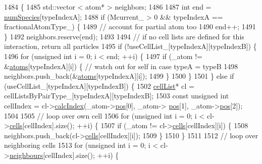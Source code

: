 \begin{DoxyCode}
1484                                                                                                            
                    \{
1485     std::vector < atom* > neighbors;
1486 
1487     \textcolor{keywordtype}{int} end = \hyperlink{classsim_system_a9eea865e6dc1cff377b1e79c4d9c23f0}{numSpecies}[typeIndexA];
1488     \textcolor{keywordflow}{if} (Mcurrent\_ > 0 && typeIndexA == fractionalAtomType\_) \{
1489         \textcolor{comment}{// account for partial atom too}
1490         end++;
1491     \}
1492     neighbors.reserve(end);
1493 
1494     \textcolor{comment}{// if no cell lists are defined for this interaction, return all particles}
1495     \textcolor{keywordflow}{if} (!useCellList\_[typeIndexA][typeIndexB]) \{
1496         \textcolor{keywordflow}{for} (\textcolor{keywordtype}{unsigned} \textcolor{keywordtype}{int} i = 0; i < end; ++i) \{
1497             \textcolor{keywordflow}{if} (\_atom != &\hyperlink{classsim_system_a90421b19082f7fb8fc23b7264b1161e4}{atoms}[typeIndexA][i]) \{ \textcolor{comment}{// watch out for self in case typeA = typeB}
1498                 neighbors.push\_back(&\hyperlink{classsim_system_a90421b19082f7fb8fc23b7264b1161e4}{atoms}[typeIndexA][i]);
1499             \}
1500         \}
1501     \} \textcolor{keywordflow}{else} \textcolor{keywordflow}{if} (useCellList\_[typeIndexA][typeIndexB]) \{
1502         \hyperlink{classcell_list}{cellList}* cl = cellListsByPairType\_[typeIndexA][typeIndexB];
1503         \textcolor{keyword}{const} \textcolor{keywordtype}{unsigned} \textcolor{keywordtype}{int} cellIndex = cl->\hyperlink{classcell_list_aa6b843131cd487164a137571c7343cab}{calcIndex}(\_atom->\hyperlink{classatom_a3ae5f4880e7831d8b2c9fda72b4eb24a}{pos}[0], \_atom->
      \hyperlink{classatom_a3ae5f4880e7831d8b2c9fda72b4eb24a}{pos}[1], \_atom->\hyperlink{classatom_a3ae5f4880e7831d8b2c9fda72b4eb24a}{pos}[2]);
1504 
1505         \textcolor{comment}{// loop over own cell}
1506         \textcolor{keywordflow}{for} (\textcolor{keywordtype}{unsigned} \textcolor{keywordtype}{int} i = 0; i < cl->\hyperlink{classcell_list_a10bc0c3ae819293b1e88bc7d1bfdb2aa}{cells}[cellIndex].size(); ++i) \{
1507             \textcolor{keywordflow}{if} (\_atom != cl->\hyperlink{classcell_list_a10bc0c3ae819293b1e88bc7d1bfdb2aa}{cells}[cellIndex][i]) \{
1508                 neighbors.push\_back(cl->\hyperlink{classcell_list_a10bc0c3ae819293b1e88bc7d1bfdb2aa}{cells}[cellIndex][i]);
1509             \}
1510         \}
1511 
1512         \textcolor{comment}{// loop over neighboring cells}
1513         \textcolor{keywordflow}{for} (\textcolor{keywordtype}{unsigned} \textcolor{keywordtype}{int} i = 0; i < cl->\hyperlink{classcell_list_ada607886d0e5a20d710dde694d6d989f}{neighbours}[cellIndex].size(); ++i) \{

\end{DoxyCode}
